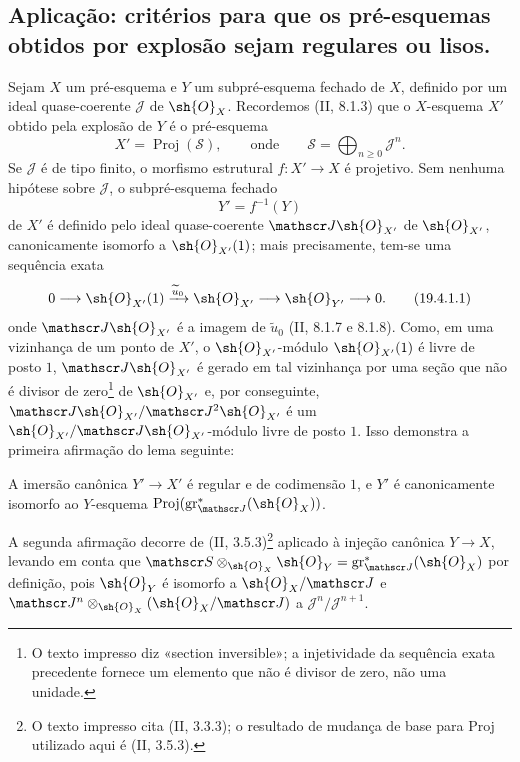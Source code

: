 \subsection{Aplicação: critérios para que os pré-esquemas obtidos por explosão sejam regulares ou lisos.}
\label{subsection:IV.19.4}


\begin{env}[19.4.1]
\label{IV.19.4.1}
Sejam $X$ um pré-esquema e $Y$ um subpré-esquema fechado de $X$, definido por um ideal quase-coerente $\mathscr J$ de $\sh{O}_X$. Recordemos (II, 8.1.3) que o $X$-esquema $X'$ obtido pela explosão de $Y$ é o pré-esquema
\[
  X'=\operatorname{Proj}(\mathscr S),\qquad\text{onde}\qquad \mathscr S=\bigoplus_{n\geq0}\mathscr J^n.
\]
Se $\mathscr J$ é de tipo finito, o morfismo estrutural $f:X'\to X$ é projetivo. Sem nenhuma hipótese sobre $\mathscr J$, o subpré-esquema fechado
\[
  Y'=f^{-1}(Y)
\]
de $X'$ é definido pelo ideal quase-coerente $\mathscr J\sh{O}_{X'}$ de $\sh{O}_{X'}$, canonicamente isomorfo a $\sh{O}_{X'}(1)$; mais precisamente, tem-se uma sequência exata
\begin{equation}
  0\longrightarrow\sh{O}_{X'}(1)\xrightarrow{\widetilde u_0}\sh{O}_{X'}\longrightarrow\sh{O}_{Y'}\longrightarrow0.
  \tag{19.4.1.1}\label{IV.19.4.1.1}
\end{equation}
onde $\mathscr J\sh{O}_{X'}$ é a imagem de $\widetilde u_0$ (II, 8.1.7 e 8.1.8). Como, em uma vizinhança de um ponto de $X'$, o $\sh{O}_{X'}$-módulo $\sh{O}_{X'}(1)$ é livre de posto $1$, $\mathscr J\sh{O}_{X'}$ é gerado em tal vizinhança por uma seção que não é divisor de zero\footnote{O texto impresso diz «section inversible»; a injetividade da sequência exata precedente fornece um elemento que não é divisor de zero, não uma unidade.} de $\sh{O}_{X'}$ e, por conseguinte, $\mathscr J\sh{O}_{X'}/\mathscr J^2\sh{O}_{X'}$ é um $\sh{O}_{X'}/\mathscr J\sh{O}_{X'}$-módulo livre de posto $1$. Isso demonstra a primeira afirmação do lema seguinte:
\end{env}

\begin{lemma}[19.4.2]
\label{IV.19.4.2}
A imersão canônica $Y'\to X'$ é regular e de codimensão $1$, e $Y'$ é canonicamente isomorfo ao $Y$-esquema $\operatorname{Proj}(\operatorname{gr}_{\mathscr J}^*(\sh{O}_X))$.
\end{lemma}

A segunda afirmação decorre de (II, 3.5.3)\footnote{O texto impresso cita (II, 3.3.3); o resultado de mudança de base para Proj utilizado aqui é (II, 3.5.3).} aplicado à injeção canônica $Y\to X$, levando em conta que $\mathscr S\otimes_{\sh{O}_X}\sh{O}_Y=\operatorname{gr}_{\mathscr J}^*(\sh{O}_X)$ por definição, pois $\sh{O}_Y$ é isomorfo a $\sh{O}_X/\mathscr J$ e $\mathscr J^n\otimes_{\sh{O}_X}(\sh{O}_X/\mathscr J)$ a $\mathscr J^n/\mathscr J^{n+1}$.

